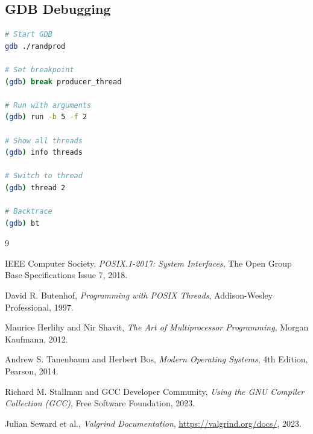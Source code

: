 \documentclass[12pt,a4paper]{article}
\begin{document}
\subsection*{GDB Debugging}

\begin{lstlisting}[language=bash, caption={GDB Thread Debugging}]
# Start GDB
gdb ./randprod

# Set breakpoint
(gdb) break producer_thread

# Run with arguments
(gdb) run -b 5 -f 2

# Show all threads
(gdb) info threads

# Switch to thread
(gdb) thread 2

# Backtrace
(gdb) bt
\end{lstlisting}

\clearpage

\begin{thebibliography}{9}

IEEE Computer Society,
\textit{POSIX.1-2017: System Interfaces},
The Open Group Base Specifications Issue 7, 2018.

David R. Butenhof,
\textit{Programming with POSIX Threads},
Addison-Wesley Professional, 1997.

Maurice Herlihy and Nir Shavit,
\textit{The Art of Multiprocessor Programming},
Morgan Kaufmann, 2012.

Andrew S. Tanenbaum and Herbert Bos,
\textit{Modern Operating Systems}, 4th Edition,
Pearson, 2014.

Richard M. Stallman and GCC Developer Community,
\textit{Using the GNU Compiler Collection (GCC)},
Free Software Foundation, 2023.

Julian Seward et al.,
\textit{Valgrind Documentation},
\url{https://valgrind.org/docs/}, 2023.

\end{thebibliography}
\end{document}

